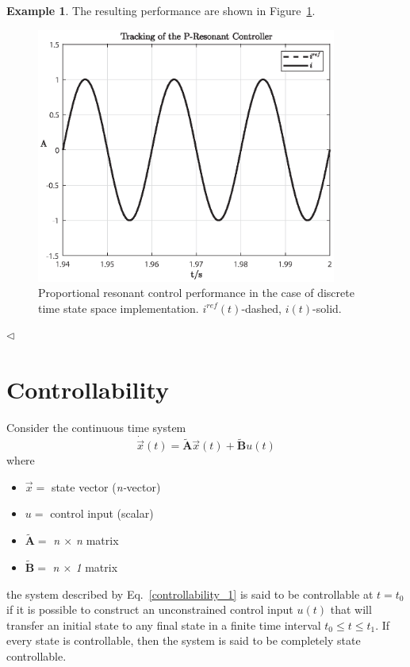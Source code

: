 \documentclass[11pt,a4paper,oneside]{book}
\numberwithin{equation}{section}
\theoremstyle{it}
\theoremstyle{definition}
\newtheorem{example}{Example}[chapter]
\begin{document}
\begin{example}
The resulting performance are shown in Figure~\ref{figure_ss}.
	\begin{figure}[H]
		\centering
		\includegraphics[width = 280pt, keepaspectratio] 
		{figures/PRssd_performance.eps}
		\captionsetup{width=0.5\textwidth, font=small}		
		\caption{Proportional resonant control performance in the case of discrete time state space implementation. $i^{ref}(t)$-dashed, $i(t)$-solid.}
		\label{figure_ss}
	\end{figure}
$\triangleleft$
\end{example}

\section{Controllability}
Consider the continuous time system
\begin{equation} \label{controllability_1}
	\dot{\vec x}(t) = \tilde{\mathbf{A}} \vec x(t) +\tilde{\mathbf{B}}u(t)
\end{equation}
where	\begin{itemize} 
	\item $\vec x = $ state vector (\textit{n-}vector)	
	\item $u = $ control input (scalar)
	\item $ \tilde{\mathbf{A}} = $ \textit{n $\times$ n} matrix
	\item $ \tilde{\mathbf{B}} = $ \textit{n $\times$ 1} matrix
\end{itemize}
the system described by Eq.~\eqref{controllability_1} is said to be 
controllable at $t=t_0$ if it is possible to  construct an unconstrained 
control input $u(t)$ that will transfer an initial state to any final state in 
a finite time interval $t_0\le t\le t_1$. If every state is controllable, then 
the system is said to be completely state controllable. 
\end{document}

